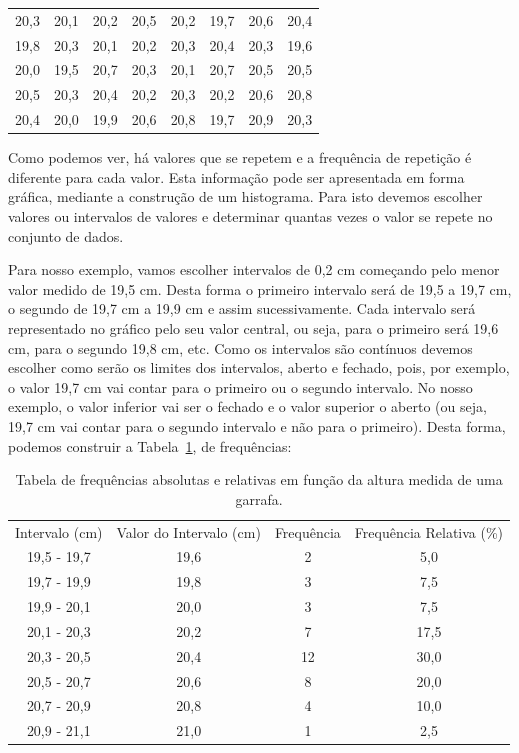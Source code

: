 \begin{center}
\hspace{-0.8cm}
  \begin{tabular}[m]{c c c c c c c c}
 20,3	 & 20,1 & 20,2 & 20,5 & 20,2 & 19,7 & 20,6 & 20,4\\
 19,8 & 20,3 & 20,1 & 20,2 & 20,3 & 20,4 & 20,3 & 19,6\\
 20,0 & 19,5 & 20,7 & 20,3 & 20,1 & 20,7 & 20,5 & 20,5\\
 20,5 & 20,3 & 20,4 & 20,2 & 20,3 & 20,2 & 20,6 & 20,8\\
 20,4 & 20,0 & 19,9 & 20,6 & 20,8 & 19,7 & 20,9 & 20,3\\
  \end{tabular}
\end{center}
\vspace{-0.3cm}

Como podemos ver, há valores que se repetem e a frequência de repetição é diferente para cada valor. Esta informação pode ser apresentada em forma gráfica, mediante a construção de um histograma. Para isto devemos escolher valores ou intervalos de valores e determinar quantas vezes o valor se repete no conjunto de dados.

Para nosso exemplo, vamos escolher intervalos de 0,2 cm começando pelo menor valor medido de 19,5 cm.  Desta forma o primeiro intervalo será de 19,5 a 19,7 cm, o segundo de 19,7 cm a 19,9 cm e assim sucessivamente.  Cada intervalo será representado no gráfico pelo seu valor central, ou seja, para o primeiro será 19,6 cm, para o segundo 19,8 cm, etc.  Como os intervalos são contínuos devemos escolher como serão os limites dos intervalos, aberto e fechado, pois, por exemplo, o valor 19,7 cm vai contar para o primeiro ou o segundo intervalo. No nosso exemplo, o valor inferior vai ser o fechado e o valor superior o aberto (ou seja, 19,7 cm vai contar para o segundo intervalo e não para o primeiro). Desta forma, podemos construir a Tabela~\ref{tab:freq}, de frequências:
\begin{table}[!htbp]
\begin{center}
\hspace{-0.8cm}
\caption{Tabela de frequências absolutas e relativas em função da altura medida de uma garrafa.}\label{tab:freq}
  \begin{tabular}[m]{|c| c| c| c|}
  Intervalo (cm) & Valor do Intervalo (cm)	& Frequência & Frequência Relativa (\%)  \\
19,5 - 19,7	&	19,6	&	2   & 5,0 \\
19,7 - 19,9	&	19,8	&	3   & 7,5\\
19,9 - 20,1 	&	20,0	&	3   & 7,5\\
20,1	- 20,3	&	20,2	&	7   & 17,5\\
20,3 - 20,5	&	20,4	&	12 & 30,0\\
20,5 - 20,7	&	20,6	&	8   & 20,0\\
20,7 - 20,9	&	20,8	&	4   & 10,0 \\
20,9	- 21,1	&	21,0	&	1   &  2,5\\ 	
  \end{tabular}
\end{center}
\end{table}
\vspace{0.3cm}

